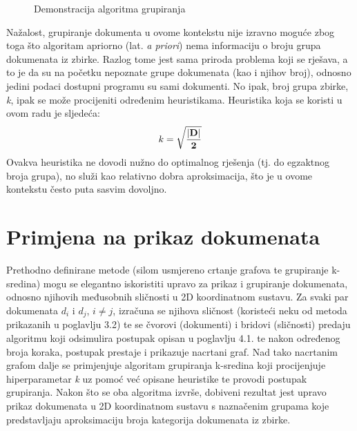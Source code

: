 \documentclass[times, utf8, zavrsni]{fer}
\begin{document}
\begin{figure}
\caption{Demonstracija algoritma grupiranja}
\end{figure}

Nažalost, grupiranje dokumenta u ovome kontekstu nije izravno moguće zbog toga što algoritam apriorno (lat. \textit{a priori}) nema informaciju o broju grupa dokumenata iz zbirke. Razlog tome jest sama priroda problema koji se rješava, a to je da su na početku nepoznate grupe dokumenata (kao i njihov broj), odnosno jedini podaci dostupni programu su sami dokumenti. No ipak, broj grupa zbirke, \textit{k}, ipak se može procijeniti određenim heuristikama. Heuristika koja se koristi u ovom radu je sljedeća:
\begin{equation}
{k}={\mathbf {\sqrt{|D| \over 2}}}
\end{equation}
Ovakva heuristika ne dovodi nužno do optimalnog rješenja (tj. do egzaktnog broja grupa), no služi kao relativno dobra aproksimacija, što je u ovome kontekstu često puta sasvim dovoljno.

\section{Primjena na prikaz dokumenata}
Prethodno definirane metode (silom usmjereno crtanje grafova te grupiranje k-sredina) mogu se elegantno iskoristiti upravo za prikaz i grupiranje dokumenata, odnosno njihovih međusobnih sličnosti u 2D koordinatnom sustavu. Za svaki par dokumenata $d_{i}$ i $d_{j}$, $i \neq j$, izračuna se njihova sličnost (koristeći neku od metoda prikazanih u poglavlju 3.2) te se čvorovi (dokumenti) i bridovi (sličnosti) predaju algoritmu koji odsimulira postupak opisan u poglavlju 4.1. te nakon određenog broja koraka, postupak prestaje i prikazuje nacrtani graf.
Nad tako nacrtanim grafom dalje se primjenjuje algoritam grupiranja k-sredina koji procijenjuje hiperparametar \textit{k} uz pomoć već opisane heuristike te provodi postupak grupiranja. Nakon što se oba algoritma izvrše, dobiveni rezultat jest upravo prikaz dokumenata u 2D koordinatnom sustavu s naznačenim grupama koje predstavljaju aproksimaciju broja kategorija dokumenata iz zbirke.
\end{document}
